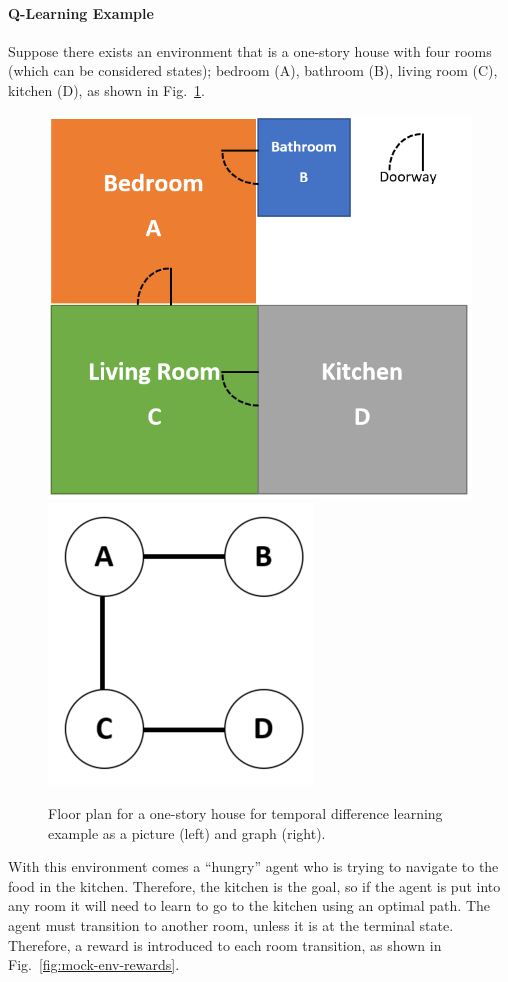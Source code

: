 \documentclass[12pt,american]{report}
\begin{document}
\paragraph{Q-Learning Example}
Suppose there exists an environment that is a one-story house with four rooms (which can be considered states); bedroom (A), bathroom (B), living room (C), kitchen (D), as shown in Fig.~\ref{fig:mock-env}. 
\begin{figure}
\centering
\includegraphics[scale=.75]{images/mock-env.png}
\includegraphics[scale=1]{images/mock-env-graph.png}
\caption{Floor plan for a one-story house for temporal difference learning example as a picture (left) and graph (right).}
\label{fig:mock-env}
\end{figure}
With this environment comes a ``hungry'' agent who is trying to navigate to the food in the kitchen. Therefore, the kitchen is the goal, so if the agent is put into any room it will need to learn to go to the kitchen using an optimal path. The agent must transition to another room, unless it is at the terminal state.  Therefore, a reward is introduced to each room transition, as shown in Fig.~\ref{fig:mock-env-rewards}. 
\end{document}
